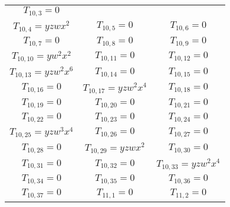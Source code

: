 \begin{longtable}{|c|c|c|}
$T_{10,3}= 0$\\

$T_{10,4}= yzwx^2$&

$T_{10,5}= 0$&

$T_{10,6}= 0$\\

$T_{10,7}= 0$&

$T_{10,8}= 0$&

$T_{10,9}= 0$\\

$T_{10,10}= yw^2x^2$&

$T_{10,11}= 0$&

$T_{10,12}= 0$\\

$T_{10,13}= yzw^2x^6$&

$T_{10,14}= 0$&

$T_{10,15}= 0$\\

$T_{10,16}= 0$&

$T_{10,17}= yzw^2x^4$&

$T_{10,18}= 0$\\

$T_{10,19}= 0$&

$T_{10,20}= 0$&

$T_{10,21}= 0$\\

$T_{10,22}= 0$&

$T_{10,23}= 0$&

$T_{10,24}= 0$\\

$T_{10,25}= yzw^3x^4$&

$T_{10,26}= 0$&

$T_{10,27}= 0$\\

$T_{10,28}= 0$&

$T_{10,29}= yzwx^2$&

$T_{10,30}= 0$\\

$T_{10,31}= 0$&

$T_{10,32}= 0$&

$T_{10,33}= yzw^2x^4$\\

$T_{10,34}= 0$&

$T_{10,35}= 0$&

$T_{10,36}= 0$\\

$T_{10,37}= 0$&

$T_{11,1}= 0$&

$T_{11,2}= 0$\\


\end{longtable}
